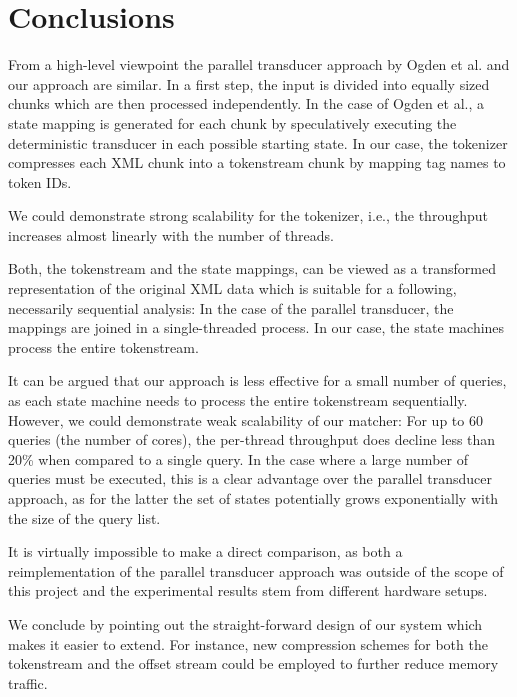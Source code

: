 \section{Conclusions}

From a high-level viewpoint the parallel transducer approach by Ogden et 
al.\cite{Ogden2013} and our approach are similar. In a first step, the input is
divided into equally sized chunks which are then processed independently. In the
case of Ogden et al., a state mapping is generated for each chunk by speculatively
executing the deterministic transducer in each possible starting state. In our case, 
the tokenizer compresses each XML chunk into a tokenstream chunk by mapping 
tag names to token IDs.

We could demonstrate strong scalability for the tokenizer, i.e., the throughput
increases almost linearly with the number of threads.

Both, the tokenstream and the state mappings, can be viewed as a transformed
representation of the original XML data which is suitable for a following,
necessarily sequential analysis: In the case of the parallel transducer, the
mappings are joined in a single-threaded process. In our case, the state
machines process the entire tokenstream.

It can be argued that our approach is less effective for a small number of
queries, as each state machine needs to process the entire tokenstream
sequentially. However, we could demonstrate weak scalability of our matcher:
For up to 60 queries (the number of cores), the per-thread throughput does
decline less than 20\% when compared to a single query. In the case where
a large number of queries must be executed, this is a clear advantage over the
parallel transducer approach, as for the latter the set of states potentially
grows exponentially with the size of the query list.

It is virtually impossible to make a direct comparison, as both a reimplementation 
of the parallel transducer approach was outside of the scope of this project and 
the experimental results stem from different hardware setups.

We conclude by pointing out the straight-forward design of our system which
makes it easier to extend. For instance, new compression schemes for both
the tokenstream and the offset stream could be employed to further reduce
memory traffic.
